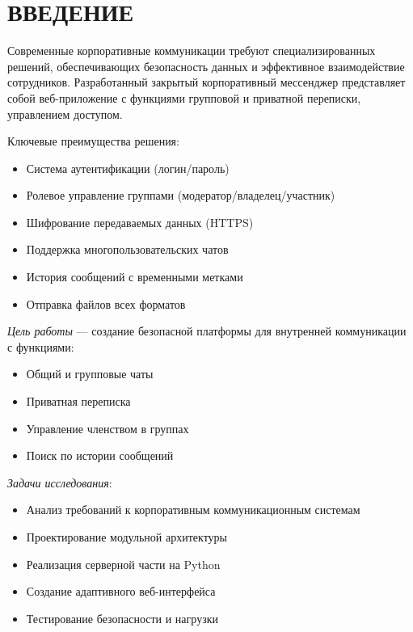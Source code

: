 \section*{ВВЕДЕНИЕ}

Современные корпоративные коммуникации требуют специализированных решений, обеспечивающих безопасность данных и эффективное взаимодействие сотрудников. Разработанный закрытый корпоративный мессенджер представляет собой веб-приложение с функциями групповой и приватной переписки, управлением доступом.

Ключевые преимущества решения:
\begin{itemize}
	\item Система аутентификации (логин/пароль)
	\item Ролевое управление группами (модератор/владелец/участник)
	\item Шифрование передаваемых данных (HTTPS)
	\item Поддержка многопользовательских чатов
	\item История сообщений с временными метками
	\item Отправка файлов всех форматов
\end{itemize}

\emph{Цель работы} — создание безопасной платформы для внутренней коммуникации с функциями:
\begin{itemize}
	\item Общий и групповые чаты
	\item Приватная переписка
	\item Управление членством в группах
	\item Поиск по истории сообщений
\end{itemize}

\emph{Задачи исследования}:
\begin{itemize}
	\item Анализ требований к корпоративным коммуникационным системам
	\item Проектирование модульной архитектуры
	\item Реализация серверной части на Python
	\item Создание адаптивного веб-интерфейса
	\item Тестирование безопасности и нагрузки
\end{itemize}